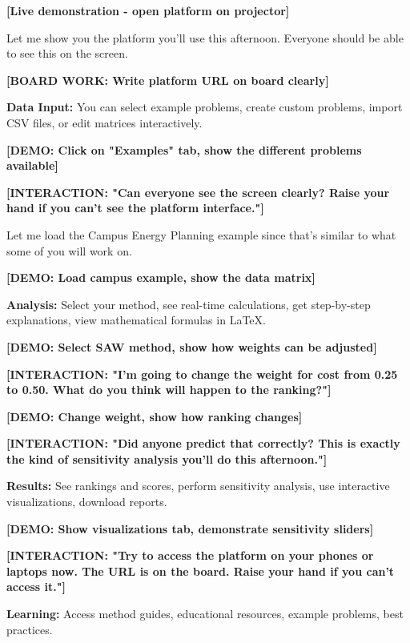 \documentclass[12pt]{article}
\begin{document}
\textcolor{speakernote}{\textbf{[Live demonstration - open platform on projector]}}

Let me show you the platform you'll use this afternoon. Everyone should be able to see this on the screen.

\textcolor{speakernote}{\textbf{[BOARD WORK: Write platform URL on board clearly]}}

\textcolor{emphasis}{\textbf{Data Input:}} You can select example problems, create custom problems, import CSV files, or edit matrices interactively.

\textcolor{speakernote}{\textbf{[DEMO: Click on "Examples" tab, show the different problems available]}}

\textcolor{speakernote}{\textbf{[INTERACTION: "Can everyone see the screen clearly? Raise your hand if you can't see the platform interface."]}}

Let me load the Campus Energy Planning example since that's similar to what some of you will work on.

\textcolor{speakernote}{\textbf{[DEMO: Load campus example, show the data matrix]}}

\textcolor{emphasis}{\textbf{Analysis:}} Select your method, see real-time calculations, get step-by-step explanations, view mathematical formulas in LaTeX.

\textcolor{speakernote}{\textbf{[DEMO: Select SAW method, show how weights can be adjusted]}}

\textcolor{speakernote}{\textbf{[INTERACTION: "I'm going to change the weight for cost from 0.25 to 0.50. What do you think will happen to the ranking?"]}}

\textcolor{speakernote}{\textbf{[DEMO: Change weight, show how ranking changes]}}

\textcolor{speakernote}{\textbf{[INTERACTION: "Did anyone predict that correctly? This is exactly the kind of sensitivity analysis you'll do this afternoon."]}}

\textcolor{emphasis}{\textbf{Results:}} See rankings and scores, perform sensitivity analysis, use interactive visualizations, download reports.

\textcolor{speakernote}{\textbf{[DEMO: Show visualizations tab, demonstrate sensitivity sliders]}}

\textcolor{speakernote}{\textbf{[INTERACTION: "Try to access the platform on your phones or laptops now. The URL is on the board. Raise your hand if you can't access it."]}}

\textcolor{emphasis}{\textbf{Learning:}} Access method guides, educational resources, example problems, best practices.
\end{document}
